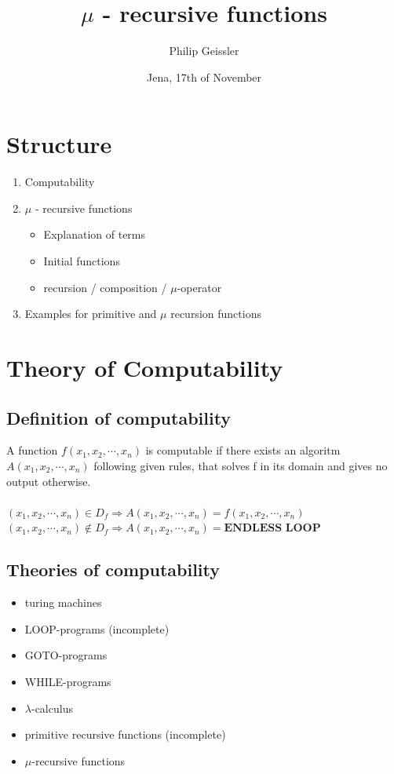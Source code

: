 \documentclass[a4paper,12pt]{scrreprt}
\title{$\mu$ - recursive functions}
\author{Philip Geissler}
\affil{Carl-Zeiss Grammar School}
\date{Jena, 17th of November}
\begin{document}
\maketitle	

\section*{Structure}
\begin{enumerate}
	\item Computability
	\item $\mu$ - recursive functions
	\begin{itemize}
		\item Explanation of terms
		\item Initial functions
		\item recursion / composition / $\mu$-operator
	\end{itemize}
	\item Examples for primitive and $\mu$ recursion functions
\end{enumerate}

\section*{Theory of Computability}
\subsection*{Definition of computability}
A function $f(x_1,x_2,\cdots,x_n)$ is computable if there exists an algoritm $A(x_1,x_2,\cdots,x_n)$ following given rules, that solves f in its domain and gives no output otherwise.\\ \\
$(x_1,x_2,\cdots,x_n) \in D_f \Longrightarrow  A(x_1,x_2,\cdots,x_n) = f(x_1,x_2,\cdots,x_n)$\\
$(x_1,x_2,\cdots,x_n) \notin D_f \Longrightarrow  A(x_1,x_2,\cdots,x_n) = \textbf{ENDLESS LOOP}$\\

\subsection*{Theories of computability}
\begin{itemize}
\item{turing machines}
\item LOOP-programs (incomplete)
\item{GOTO-programs}
\item{WHILE-programs}
\item{$\lambda$-calculus}
\item{} primitive recursive functions (incomplete)
\item{} $\mu$-recursive functions
\end{itemize}
\end{document}
